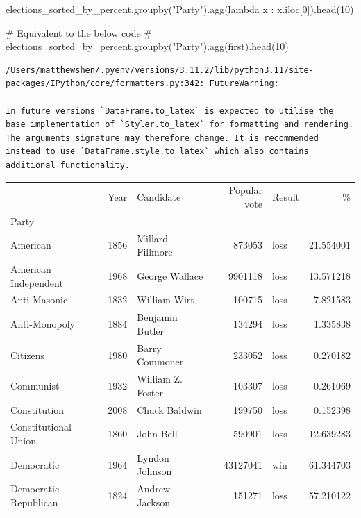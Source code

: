 \documentclass[
  letterpaper,
  DIV=11,
  numbers=noendperiod]{scrreprt}
\newenvironment{Shaded}{\begin{snugshade}}{\end{snugshade}}
\newcommand{\CommentTok}[1]{\textcolor[rgb]{0.37,0.37,0.37}{#1}}
\newcommand{\DecValTok}[1]{\textcolor[rgb]{0.68,0.00,0.00}{#1}}
\newcommand{\KeywordTok}[1]{\textcolor[rgb]{0.00,0.23,0.31}{#1}}
\newcommand{\NormalTok}[1]{\textcolor[rgb]{0.00,0.23,0.31}{#1}}
\newcommand{\StringTok}[1]{\textcolor[rgb]{0.13,0.47,0.30}{#1}}
\begin{document}
\begin{Shaded}
\begin{Highlighting}[]
\NormalTok{elections\_sorted\_by\_percent.groupby(}\StringTok{"Party"}\NormalTok{).agg(}\KeywordTok{lambda}\NormalTok{ x : x.iloc[}\DecValTok{0}\NormalTok{]).head(}\DecValTok{10}\NormalTok{)}

\CommentTok{\# Equivalent to the below code}
\CommentTok{\# elections\_sorted\_by\_percent.groupby("Party").agg(\textquotesingle{}first\textquotesingle{}).head(10)}
\end{Highlighting}
\end{Shaded}

\begin{verbatim}
/Users/matthewshen/.pyenv/versions/3.11.2/lib/python3.11/site-packages/IPython/core/formatters.py:342: FutureWarning:

In future versions `DataFrame.to_latex` is expected to utilise the base implementation of `Styler.to_latex` for formatting and rendering. The arguments signature may therefore change. It is recommended instead to use `DataFrame.style.to_latex` which also contains additional functionality.
\end{verbatim}

\begin{tabular}{lrlrlr}
\toprule
{} &  Year &          Candidate &  Popular vote & Result &          \% \\
Party                 &       &                    &               &        &            \\
\midrule
American              &  1856 &   Millard Fillmore &        873053 &   loss &  21.554001 \\
American Independent  &  1968 &     George Wallace &       9901118 &   loss &  13.571218 \\
Anti-Masonic          &  1832 &       William Wirt &        100715 &   loss &   7.821583 \\
Anti-Monopoly         &  1884 &    Benjamin Butler &        134294 &   loss &   1.335838 \\
Citizens              &  1980 &     Barry Commoner &        233052 &   loss &   0.270182 \\
Communist             &  1932 &  William Z. Foster &        103307 &   loss &   0.261069 \\
Constitution          &  2008 &      Chuck Baldwin &        199750 &   loss &   0.152398 \\
Constitutional Union  &  1860 &          John Bell &        590901 &   loss &  12.639283 \\
Democratic            &  1964 &     Lyndon Johnson &      43127041 &    win &  61.344703 \\
Democratic-Republican &  1824 &     Andrew Jackson &        151271 &   loss &  57.210122 \\
\bottomrule
\end{tabular}
\end{document}
